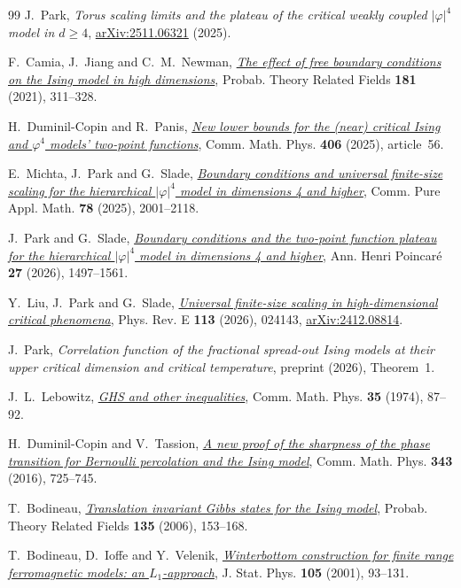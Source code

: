 \documentclass[11pt]{article}
\numberwithin{equation}{section}
\begin{document}
\begin{thebibliography}{99}
J.~Park, \emph{Torus scaling limits and the plateau of the critical
weakly coupled $|\varphi|^4$ model in $d\ge4$},
\href{https://arxiv.org/abs/2511.06321}{arXiv:2511.06321} (2025).

F.~Camia, J.~Jiang and C.~M.~Newman,
\href{https://doi.org/10.1007/s00440-021-01041-9}
{\emph{The effect of free boundary conditions on the Ising model in high
dimensions}}, Probab. Theory Related Fields \textbf{181} (2021), 311--328.

H.~Duminil-Copin and R.~Panis,
\href{https://doi.org/10.1007/s00220-025-05236-2}
{\emph{New lower bounds for the (near) critical Ising and $\varphi^4$
models' two-point functions}}, Comm. Math. Phys. \textbf{406}
(2025), article~56.

E.~Michta, J.~Park and G.~Slade,
\href{https://doi.org/10.1002/cpa.22256}
{\emph{Boundary conditions and universal finite-size scaling for the
hierarchical $|\varphi|^4$ model in dimensions 4 and higher}},
Comm. Pure Appl. Math. \textbf{78} (2025), 2001--2118.

J.~Park and G.~Slade,
\href{https://doi.org/10.1007/s00023-025-01566-y}
{\emph{Boundary conditions and the two-point function plateau for the
hierarchical $|\varphi|^4$ model in dimensions 4 and higher}},
Ann. Henri Poincar\'e \textbf{27} (2026), 1497--1561.

Y.~Liu, J.~Park and G.~Slade,
\href{https://doi.org/10.1103/xq7j-zll9}
{\emph{Universal finite-size scaling in high-dimensional critical
phenomena}}, Phys. Rev. E \textbf{113} (2026), 024143,
\href{https://arxiv.org/abs/2412.08814}{arXiv:2412.08814}.

J.~Park, \emph{Correlation function of the fractional spread-out Ising
models at their upper critical dimension and critical temperature},
preprint (2026), Theorem~1.

J.~L.~Lebowitz,
\href{https://cmsr.rutgers.edu/images/people/lebowitz_joel/publications/jll.pub_101.pdf}
{\emph{GHS and other inequalities}}, Comm. Math. Phys. \textbf{35}
(1974), 87--92.

H.~Duminil-Copin and V.~Tassion,
\href{https://arxiv.org/abs/1502.03050}{\emph{A new proof of the sharpness
of the phase transition for Bernoulli percolation and the Ising model}},
Comm. Math. Phys. \textbf{343} (2016), 725--745.

T.~Bodineau, \href{https://arxiv.org/abs/math/0409079}{\emph{Translation
invariant Gibbs states for the Ising model}}, Probab. Theory Related
Fields \textbf{135} (2006), 153--168.

T.~Bodineau, D.~Ioffe and Y.~Velenik,
\href{https://www.unige.ch/~velenik/papers/BIV01.pdf}{\emph{Winterbottom
construction for finite range ferromagnetic models: an $L_1$-approach}},
J. Stat. Phys. \textbf{105} (2001), 93--131.
\end{thebibliography}
\end{document}
